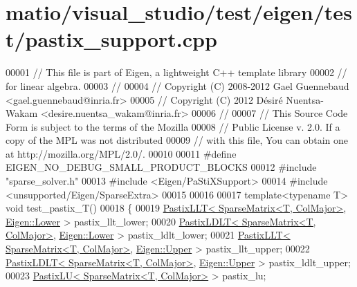 \hypertarget{matio_2visual__studio_2test_2eigen_2test_2pastix__support_8cpp_source}{}\section{matio/visual\+\_\+studio/test/eigen/test/pastix\+\_\+support.cpp}
\label{matio_2visual__studio_2test_2eigen_2test_2pastix__support_8cpp_source}

\begin{DoxyCode}
00001 \textcolor{comment}{// This file is part of Eigen, a lightweight C++ template library}
00002 \textcolor{comment}{// for linear algebra.}
00003 \textcolor{comment}{//}
00004 \textcolor{comment}{// Copyright (C) 2008-2012 Gael Guennebaud <gael.guennebaud@inria.fr>}
00005 \textcolor{comment}{// Copyright (C) 2012 Désiré Nuentsa-Wakam <desire.nuentsa\_wakam@inria.fr>}
00006 \textcolor{comment}{//}
00007 \textcolor{comment}{// This Source Code Form is subject to the terms of the Mozilla}
00008 \textcolor{comment}{// Public License v. 2.0. If a copy of the MPL was not distributed}
00009 \textcolor{comment}{// with this file, You can obtain one at http://mozilla.org/MPL/2.0/.}
00010 
00011 \textcolor{preprocessor}{#define EIGEN\_NO\_DEBUG\_SMALL\_PRODUCT\_BLOCKS}
00012 \textcolor{preprocessor}{#include "sparse\_solver.h"}
00013 \textcolor{preprocessor}{#include <Eigen/PaStiXSupport>}
00014 \textcolor{preprocessor}{#include <unsupported/Eigen/SparseExtra>}
00015 
00016 
00017 \textcolor{keyword}{template}<\textcolor{keyword}{typename} T> \textcolor{keywordtype}{void} test\_pastix\_T()
00018 \{
00019   \hyperlink{class_eigen_1_1_pastix_l_l_t}{PastixLLT< SparseMatrix<T, ColMajor>}, 
      \hyperlink{group__enums_gga39e3366ff5554d731e7dc8bb642f83cda891792b8ed394f7607ab16dd716f60e6}{Eigen::Lower} > pastix\_llt\_lower;
00020   \hyperlink{class_eigen_1_1_pastix_l_d_l_t}{PastixLDLT< SparseMatrix<T, ColMajor>}, 
      \hyperlink{group__enums_gga39e3366ff5554d731e7dc8bb642f83cda891792b8ed394f7607ab16dd716f60e6}{Eigen::Lower} > pastix\_ldlt\_lower;
00021   \hyperlink{class_eigen_1_1_pastix_l_l_t}{PastixLLT< SparseMatrix<T, ColMajor>}, 
      \hyperlink{group__enums_gga39e3366ff5554d731e7dc8bb642f83cda6bcb58be3b8b8ec84859ce0c5ac0aaec}{Eigen::Upper} > pastix\_llt\_upper;
00022   \hyperlink{class_eigen_1_1_pastix_l_d_l_t}{PastixLDLT< SparseMatrix<T, ColMajor>}, 
      \hyperlink{group__enums_gga39e3366ff5554d731e7dc8bb642f83cda6bcb58be3b8b8ec84859ce0c5ac0aaec}{Eigen::Upper} > pastix\_ldlt\_upper;
00023   \hyperlink{class_eigen_1_1_pastix_l_u}{PastixLU< SparseMatrix<T, ColMajor>} > pastix\_lu;

\end{DoxyCode}
